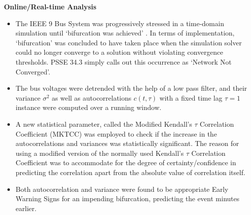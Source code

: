 \noindent\textbf{Online/Real-time Analysis}
\begin{itemize}
	\item The IEEE 9 Bus System was progressively stressed in a time-domain simulation until `bifurcation was achieved' \cite{sanchez01}. In terms of implementation, `bifurcation' was concluded to have taken place when the simulation solver could no longer converge to a solution without violating convergence thresholds. PSSE 34.3 simply calls out this occurrence as `Network Not Converged'.
	\item The bus voltages were detrended with the help of a low pass filter, and their variance $\sigma^2$ as well as autocorrelations $c(t, \tau)$ with a fixed time lag $\tau = 1$ instance were computed over a running window. 
	\item A new statistical parameter, called the Modified Kendall's $\tau$ Correlation Coefficient (MKTCC) was employed to check if the increase in the autocorrelations and variances was statistically significant. The reason for using a modified version of the normally used Kendall's $\tau$ Correlation Coefficient was to accommodate for the degree of certainty/confidence in predicting the correlation apart from the absolute value of correlation itself.
	\item Both autocorrelation and variance were found to be appropriate Early Warning Signs for an impending bifurcation, predicting the event minutes earlier. 
\end{itemize}